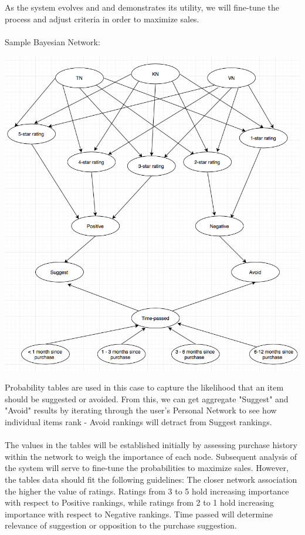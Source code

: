 \documentclass[12pt,a4paper]{article}
\begin{document}
		\\\\
		As the system evolves and and demonstrates its utility, we will fine-tune the process and adjust criteria in order to maximize sales. 
		\\\\
		Sample Bayesian Network:
		\begin{center}
			\includegraphics[width=1\linewidth]{bayes}
		\end{center}
		
		Probability tables are used in this case to capture the likelihood that an item should be suggested or avoided. From this, we can get aggregate "Suggest" and "Avoid" results by iterating through the user's Personal Network to see how individual items rank - Avoid rankings will detract from Suggest rankings.  
		\\\\
		The values in the tables will be established initially by assessing purchase history within the network to weigh the importance of each node. Subsequent analysis of the system will serve to fine-tune the probabilities to maximize sales. However, the tables data should fit the following guidelines: The closer network association the higher the value of ratings. Ratings from 3 to 5 hold increasing importance with respect to Positive rankings, while ratings from 2 to 1 hold increasing importance with respect to Negative rankings.  Time passed will determine relevance of suggestion or opposition to the purchase suggestion.
		\\\\
\end{document}
